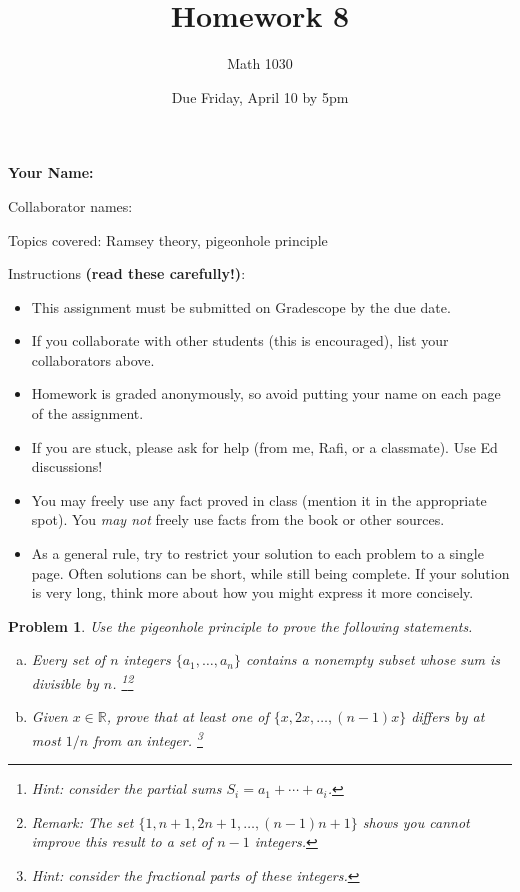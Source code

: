 \documentclass[11pt]{article}
\author{Math 1030}
\date{Due Friday, April 10 by 5pm}
\title{Homework 8}
\newtheorem{problem}{Problem}
\begin{document}
\maketitle

{\bf\Large Your Name:} 

Collaborator names: 

\vspace{.3in}
Topics covered: Ramsey theory, pigeonhole principle

Instructions {\bf (read these carefully!)}: 
\begin{itemize}
\item This assignment must be submitted on Gradescope by the due date. 
\item If you collaborate with other students (this is encouraged),  list your collaborators above. 
\item Homework is graded anonymously, so avoid putting your name on each page of the assignment.
\item If you are stuck, please ask for help (from me, Rafi, or a classmate). Use Ed discussions!  
\item You may freely use any fact proved in class (mention it in the appropriate spot). You \emph{may not} freely use facts from the book or other sources.
\item As a general rule, try to restrict your solution to each problem to a single page. Often solutions can be short, while still being complete. If your solution is very long, think more about how you might express it more concisely.
\end{itemize}
\pagebreak 


\begin{problem}
Use the pigeonhole principle to prove the following statements. 
\begin{enumerate}[(a)]
\item Every set of $n$ integers $\{a_1,\ldots,a_n\}$ contains a nonempty subset whose sum is divisible by $n$. \footnote{Hint: consider the partial sums $S_i=a_1+\cdots+a_i$.}\footnote{Remark: The set $\{1,n+1,2n+1,\ldots,(n-1)n+1\}$ shows you cannot improve this result to a set of $n-1$ integers.}
\item Given $x\in\mathbb R$, prove that at least one of $\{x,2x,\ldots,(n-1)x\}$ differs by at most $1/n$ from an integer. \footnote{Hint: consider the fractional parts of these integers.}
\end{enumerate} 
\end{problem}
\end{document}
